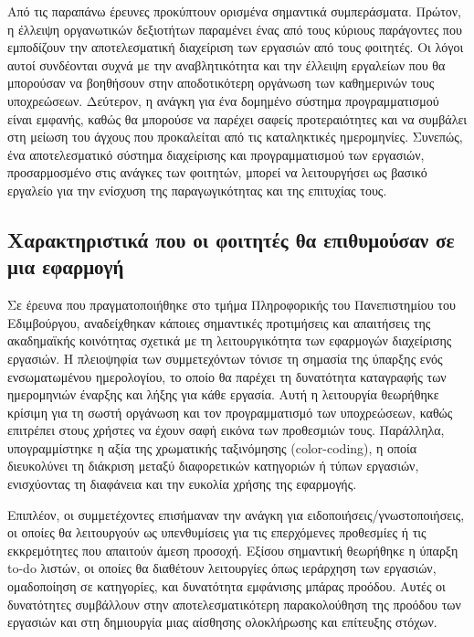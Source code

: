             Από τις παραπάνω έρευνες προκύπτουν ορισμένα σημαντικά συμπεράσματα. Πρώτον, η έλλειψη οργανωτικών δεξιοτήτων παραμένει ένας από τους κύριους παράγοντες που εμποδίζουν την αποτελεσματική διαχείριση των εργασιών από τους φοιτητές. Οι λόγοι αυτοί συνδέονται συχνά με την αναβλητικότητα και την έλλειψη εργαλείων που θα μπορούσαν να βοηθήσουν στην αποδοτικότερη οργάνωση των καθημερινών τους υποχρεώσεων. Δεύτερον, η ανάγκη για ένα δομημένο σύστημα προγραμματισμού είναι εμφανής, καθώς θα μπορούσε να παρέχει σαφείς προτεραιότητες και να συμβάλει στη μείωση του άγχους που προκαλείται από τις καταληκτικές ημερομηνίες. Συνεπώς, ένα αποτελεσματικό σύστημα διαχείρισης και προγραμματισμού των εργασιών, προσαρμοσμένο στις ανάγκες των φοιτητών, μπορεί να λειτουργήσει ως βασικό εργαλείο για την ενίσχυση της παραγωγικότητας και της επιτυχίας τους.

        \subsection{Χαρακτηριστικά που οι φοιτητές θα επιθυμούσαν σε μια εφαρμογή} \label{sec:student_preferences}
            Σε έρευνα \cite{Trujillo2020} που πραγματοποιήθηκε στο τμήμα Πληροφορικής του Πανεπιστημίου του Εδιμβούργου, αναδείχθηκαν κάποιες σημαντικές προτιμήσεις και απαιτήσεις της ακαδημαϊκής κοινότητας σχετικά με τη λειτουργικότητα των εφαρμογών διαχείρισης εργασιών. Η πλειοψηφία των συμμετεχόντων τόνισε τη σημασία της ύπαρξης ενός ενσωματωμένου ημερολογίου, το οποίο θα παρέχει τη δυνατότητα καταγραφής των ημερομηνιών έναρξης και λήξης για κάθε εργασία. Αυτή η λειτουργία θεωρήθηκε κρίσιμη για τη σωστή οργάνωση και τον προγραμματισμό των υποχρεώσεων, καθώς επιτρέπει στους χρήστες να έχουν σαφή εικόνα των προθεσμιών τους. Παράλληλα, υπογραμμίστηκε η αξία της χρωματικής ταξινόμησης (color-coding), η οποία διευκολύνει τη διάκριση μεταξύ διαφορετικών κατηγοριών ή τύπων εργασιών, ενισχύοντας τη διαφάνεια και την ευκολία χρήσης της εφαρμογής.

            Επιπλέον, οι συμμετέχοντες επισήμαναν την ανάγκη για ειδοποιήσεις/γνωστοποιήσεις, οι οποίες θα λειτουργούν ως υπενθυμίσεις για τις επερχόμενες προθεσμίες ή τις εκκρεμότητες που απαιτούν άμεση προσοχή. Εξίσου σημαντική θεωρήθηκε η ύπαρξη to-do λιστών, οι οποίες θα διαθέτουν λειτουργίες όπως ιεράρχηση των εργασιών, ομαδοποίηση σε κατηγορίες, και δυνατότητα εμφάνισης μπάρας προόδου. Αυτές οι δυνατότητες συμβάλλουν στην αποτελεσματικότερη παρακολούθηση της προόδου των εργασιών και στη δημιουργία μιας αίσθησης ολοκλήρωσης και επίτευξης στόχων.

